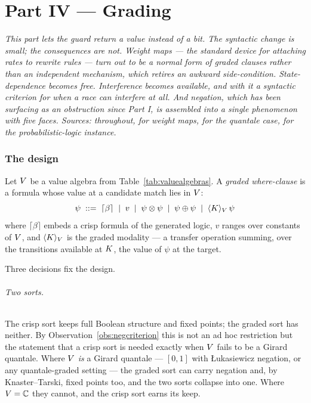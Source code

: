 \part*{Part IV --- Grading}

\bigskip
\noindent
\emph{This part lets the guard return a value instead of a bit. The syntactic
change is small; the consequences are not. Weight maps --- the standard device for
attaching rates to rewrite rules --- turn out to be a normal form of graded
clauses rather than an independent mechanism, which retires an awkward
side-condition. State-dependence becomes free. Interference becomes available, and
with it a syntactic criterion for when a race can interfere at all. And negation,
which has been surfacing as an obstruction since Part I, is assembled into a
single phenomenon with five faces. Sources: \cite{GradedWhere} throughout,
\cite{WeightedGSLT} for weight maps, \cite{FuzzyRho} for the quantale case,
\cite{Goertzel24} for the probabilistic-logic instance.}
\bigskip

\section{The design}
\label{sec:design}

Let $V$ be a value algebra from Table~\ref{tab:valuealgebras}. A \emph{graded
where-clause} is a formula whose value at a candidate match lies in $V$:
\[
  \psi \;::=\; \lceil \beta \rceil \;\mid\; v \;\mid\; \psi \otimes \psi
  \;\mid\; \psi \oplus \psi \;\mid\; \langle K \rangle_{V}\, \psi
\]
where $\lceil \beta \rceil$ embeds a crisp formula of the generated logic, $v$
ranges over constants of $V$, and $\langle K\rangle_{V}$ is the graded
modality --- a transfer operation summing, over the transitions available at
$K$, the value of $\psi$ at the target.

Three decisions fix the design.

\paragraph{Two sorts.} The crisp sort keeps full Boolean structure and fixed
points; the graded sort has neither. By Observation~\ref{obs:negcriterion} this is
not an ad hoc restriction but the statement that a crisp sort is needed exactly
when $V$ fails to be a Girard quantale. Where $V$ \emph{is} a Girard quantale ---
$[0,1]$ with \L{}ukasiewicz negation, or any quantale-graded setting
\cite{FuzzyRho} --- the graded sort can carry negation and, by Knaster--Tarski,
fixed points too, and the two sorts collapse into one. Where $V = \mathbb{C}$ they
cannot, and the crisp sort earns its keep.

